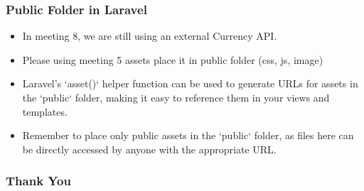 \documentclass[aspectratio=169, table]{beamer}
\begin{document}
\begin{frame}[fragile]
    \frametitle{Public Folder in Laravel}
    \begin{itemize}
        \item In meeting 8, we are still using an external Currency API.
        \item Please using meeting 5 assets place it in public folder (css, js, image)
        \item Laravel's `asset()` helper function can be used to generate URLs for assets in the `public` folder, making it easy to reference them in your views and templates.
        \item Remember to place only public assets in the `public` folder, as files here can be directly accessed by anyone with the appropriate URL.
    \end{itemize}
\end{frame}


\begin{frame4}
    \frametitle{Thank You}
\end{frame4}
\end{document}

